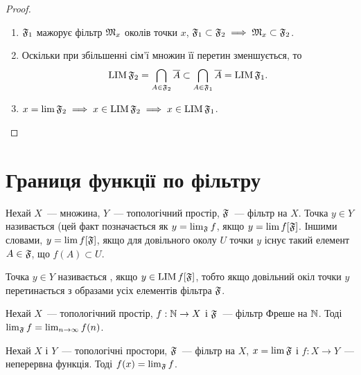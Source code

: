 \begin{proof}
    \listhack
    \begin{enumerate}
        \item $\frak F_1$ мажорує фільтр $\frak M_x$ околів точки $x$, $\frak F_1 \subset \frak F_2 \implies \frak M_x \subset \frak F_2$.

        \item Оскільки при збільшенні сім'ї множин її перетин зменшується, то
        \begin{equation*}
            \LIM \frak F_2 = \bigcap_{A \in \frak F_2} \closure A \subset \bigcap_{A \in \frak F_1} \closure A = \LIM \frak F_1.
        \end{equation*}

        \item $x = \lim \frak F_2 \implies x \in \LIM \frak F_2 \implies x \in \LIM \frak F_1$. \qedhere
    \end{enumerate}
\end{proof}

\section{Границя функції по фільтру}

\begin{definition}
    Нехай $X$~--- множина, $Y$~--- топологічний простір, $\frak F$~--- фільтр на $X$. Точка $y \in Y$ називається  (цей факт позначається як $y = \lim_{\frak F} f$, якщо $y = \lim f[\frak F]$. Іншими словами, $y = \lim f [\frak F]$, якщо для довільного околу $U$ точки $y$ існує такий елемент $A \in \frak F$, що $f(A) \subset U$.
\end{definition}

\begin{definition}
    Точка $y \in Y$ називається , якщо $y \in \LIM f[\frak F]$, тобто якщо довільний окіл точки $y$ перетинається з образами усіх елементів фільтра $\frak F$.
\end{definition}

\begin{example}
    Нехай $X$~--- топологічний простір, $f: \NN \to X$ і $\frak F$~--- фільтр Фреше на $\NN$. Тоді $\lim_{\frak F} f = \lim_{n \to \infty} f(n)$.
\end{example}

\begin{theorem}
    \label{th:filter-continuity}
    Нехай $X$ і $Y$~--- топологічні простори, $\frak F$~--- фільтр на $X$, $x = \lim \frak F$ і $f: X \to Y$~--- неперервна функція. Тоді $f(x) = \lim_{\frak F} f$.
\end{theorem}


